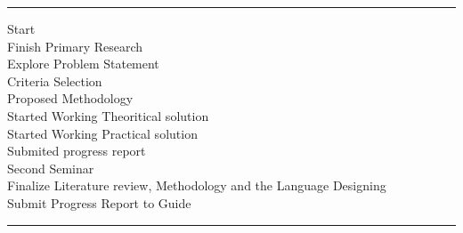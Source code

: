 \begin{table}[h]
    \small{
    \captionsetup{singlelinecheck=false, font=blue, labelfont=sc, labelsep=quad}
    \begin{minipage}[t]{.7\linewidth}
    \color{gray}
    \rule{\linewidth}{1pt}
     {Start\\}
     {Finish Primary Research\\}
     {Explore Problem Statement\\}
     {Criteria Selection\\}
     {Proposed Methodology\\}
     {Started Working Theoritical solution\\}
     {Started Working Practical solution\\}
      {Submited progress report\\}
      {Second Seminar\\}
      {Finalize Literature review, Methodology and the Language Designing\\}
      {Submit Progress Report to Guide\\}
    \bigskip
    \rule{\linewidth}{1pt}%
    \end{minipage}
    }%
\end{table}